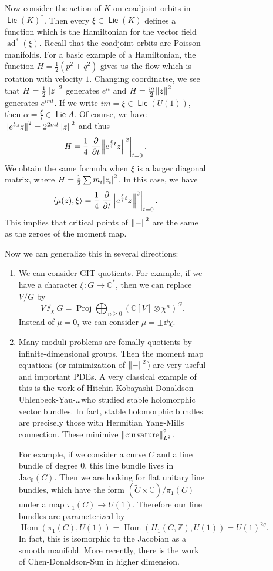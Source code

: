 \documentclass[leqno, openany]{memoir}
\theoremstyle{definition}
\theoremstyle{remark}
\theoremstyle{plain}
\theoremstyle{definition}
\theoremstyle{remark}
\newcommand{\C}{\mathbb{C}}
\newcommand{\Z}{\mathbb{Z}}
\newcommand{\mr}[1]{\mathrm{#1}}
\newcommand{\wtl}[1]{\widetilde{#1}}
\DeclareMathOperator{\Hom}{Hom}
\DeclareMathOperator{\ad}{ad}
\DeclareMathOperator{\Proj}{Proj}
\DeclareMathOperator{\Lie}{\mathsf{Lie}}
\begin{document}
\begin{figure}[H]
\begin{figure}[H]
Now consider the action of $K$ on coadjoint orbits in ${\Lie(K)}^*$. Then every
$\xi \in \Lie(K)$ defines a function which is the Hamiltonian for the vector
field $\ad^*(\xi)$. Recall that the coadjoint orbits are Poisson manifolds. For
a basic example of a Hamiltonian, the function $H = \frac{1}{2}(p^2 + q^2)$
gives us the flow which is rotation with velocity $1$. Changing coordinatse, we
see that $H = \frac{1}{2} \norm{z}^2$ generates $e^{it}$ and $H = \frac{m}{2}
\norm{z}^2$ generates $e^{im t}$. If we write $im = \xi \in \Lie(U(1))$, then
$\alpha = \frac{\xi}{i} \in \Lie A$. Of course, we have $\norm{e^{t \alpha}z}^2
= 2^{2mt} \norm{z}^2$ and thus \[ H = \frac{1}{4} \eval{\pdv{t}
\norm{e^{\frac{\xi}{i}t} z}^2}_{t = 0}. \] We obtain the same formula when
$\xi$ is a larger diagonal matrix, where $H = \frac{1}{2} \sum m_i
\abs{z_i}^2$. In this case, we have \[ \ev{\mu(z), \xi} = \frac{1}{4}
\eval{\pdv{t} \norm{e^{\frac{\xi}{i}t}z}^2}_{t = 0}. \] This implies that
critical points of $\norm{-}^2$ are the same as the zeroes of the moment map.

Now we can generalize this in several directions: \begin{enumerate} \item We
    can consider GIT quotients. For example, if we have a character $\xi \colon
    G \to \C^*$, then we can replace $V/G$ by \[ V \sslash_{\chi} G = \Proj
    \bigoplus_{n \geq 0} {(\C[V] \otimes \chi^n)}^G. \] Instead of $\mu = 0$,
    we can consider $\mu = \pm \dd{\chi}$.  \item Many moduli problems are
    fomally quotients by infinite-dimensional groups. Then the moment map
    equations (or minimization of $\norm{-}^2$) are very useful and important
    PDEs. A very classical example of this is the work of
    Hitchin-Kobayashi-Donaldson-Uhlenbeck-Yau-\ldots who studied stable
    holomorphic vector bundles. In fact, stable holomorphic bundles are
    precisely those with Hermitian Yang-Mills connection. These minimize
    $\norm{\text{curvature}}_{L^2}^2$.

        For example, if we consider a curve $C$ and a line bundle of degree
        $0$, this line bundle lives in $\mr{Jac}_0(C)$. Then we are looking for
        flat unitary line bundles, which have the form $(\wtl{C} \times \C) /
        \pi_1(C)$ under a map $\pi_1(C) \to U(1)$. Therefore our line bundles
        are parameterized by \[ \Hom(\pi_1(C), U(1)) = \Hom(H_1(C, \Z), U(1)) =
        {U(1)}^{2g}. \] In fact, this is isomorphic to the Jacobian as a smooth
manifold. More recently, there is the work of Chen-Donaldson-Sun in higher
dimension.  \end{enumerate}


\end{figure}
\end{figure}
\end{document}
